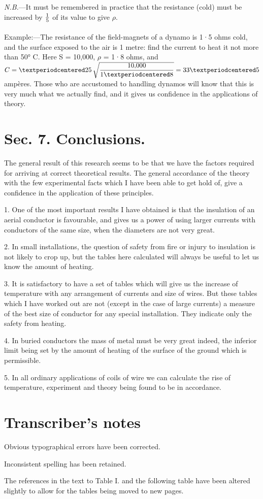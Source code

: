 \documentclass[12pt,oneside]{book}[2021/10/04]
\newenvironment{tnote}{
  \clearpage
  \setlength\parskip{5pt plus1pt}
  \raggedright
}
{
}
\newcommand{\xp}{\rule[-2.2ex]{0pt}{3.4ex}}
\newcommand{\xpa}{\rule[-1.6ex]{0pt}{3.4ex}}
\begin{document}
\textit{N.B.}—It must be remembered in practice that the resistance
(cold) must be increased by \(\xpa\frac{1}{5}\) of its value to give \(\rho\).

Example:—The resistance of the field-magnets of a dynamo
is 1·5 ohms cold, and the surface exposed to the air is 1 metre:
find the current to heat it not more than 50° C\@. Here S = 10,000,
\(\rho\) = 1·8 ohms, and \(C = ·25 \, \xp\sqrt{\dfrac{10{,}000}{1·8}} = 33·5\) ampères. Those
who are accustomed to handling dynamos will know that this is
very much what we actually find, and it gives us confidence in
the applications of theory.

\section*{Sec. 7. Conclusions.}

The general result of this research seems to be that we have
the factors required for arriving at correct theoretical results.
The general accordance of the theory with the few experimental
facts which I have been able to get hold of, give a confidence in
the application of these principles.

1. One of the most important results I have obtained is that
the insulation of an aerial conductor is favourable, and gives us a
power of using larger currents with conductors of the same size,
when the diameters are not very great.

2. In small installations, the question of safety from fire or
injury to insulation is not likely to crop up, but the tables here
calculated will always be useful to let us know the amount of
heating.

3. It is satisfactory to have a set of tables which will give us
the increase of temperature with any arrangement of currents and
size of wires. But these tables which I have worked out are not
(except in the case of large currents) a measure of the best size
of conductor for any special installation. They indicate only the
safety from heating.

4. In buried conductors the mass of metal must be very great
indeed, the inferior limit being set by the amount of heating of
the surface of the ground which is permissible.

5. In all ordinary applications of coils of wire we can calculate
the rise of temperature, experiment and theory being found to be
in accordance.

\begin{tnote}
\thispagestyle{empty}
\section*{Transcriber's notes}

Obvious typographical errors have been corrected.

Inconsistent spelling has been retained.

The references in the text to Table I. and the following table have
been altered slightly to allow for the tables being moved to
new pages.
\end{tnote}
\end{document}
